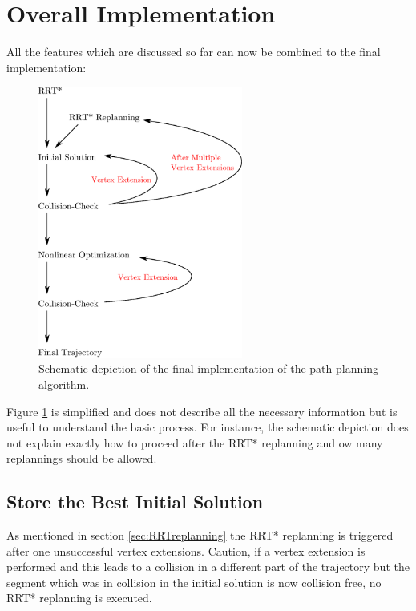 \section{Overall Implementation}

All the features which are discussed so far can now be combined to the final implementation:

\begin{figure}[h]
   \centering
   \includegraphics[width=0.6\textwidth]{pics/overall.eps}
   \caption{Schematic depiction of the final implementation of the path planning algorithm.}
   \label{pic:overall}
\end{figure}

Figure \ref{pic:overall} is simplified and does not describe all the necessary information but is useful to understand the basic process. For instance, the schematic depiction does not explain exactly how to proceed after the RRT* replanning and ow many replannings should be allowed.

\subsection{Store the Best Initial Solution}

As mentioned in section \ref{sec:RRTreplanning} the RRT* replanning is triggered after one unsuccessful vertex extensions. Caution, if a vertex extension is performed and this leads to a collision in a different part of the trajectory but the segment which was in collision in the initial solution is now collision free, no RRT* replanning is executed. \newline

